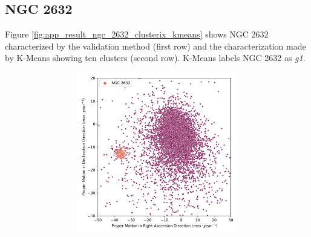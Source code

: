 \documentclass[11pt,a4paper,english,twocolumn]{article}
\begin{document}
\subsection{NGC 2632}
\label{sec:ngc2632}

Figure \ref{fig:app_result_ngc_2632_clusterix_kmeans} shows NGC 2632 characterized
by the validation method (first row) and the characterization made by K-Means
showing ten clusters (second row). K-Means labels NGC 2632 as \emph{g1}.

\begin{figure}[htbp]
  \centering
  \begin{subfigure}{\columnwidth}
    \centering
    \begin{subfigure}[t]{0.30\textwidth}
      \centering
      \includegraphics[width=\textwidth]{../figures/ngc_2632/pm_ngc_2632.png}
    \end{subfigure}
    \hfill
    \begin{subfigure}[t]{0.30\textwidth}
      \centering

\end{subfigure}
\end{subfigure}
\end{figure}
\end{document}
